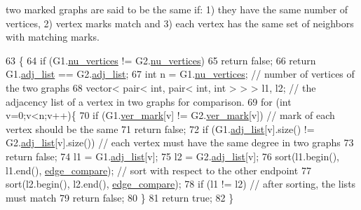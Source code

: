 two marked graphs are said to be the same if\+: 1) they have the same number of vertices, 2) vertex marks match and 3) each vertex has the same set of neighbors with matching marks. 
\begin{DoxyCode}
63 \{
64   \textcolor{keywordflow}{if} (G1.\hyperlink{classmarked__graph_acf79c6aeb8f32614cb14a5baaa6c9f9b}{nu\_vertices} != G2.\hyperlink{classmarked__graph_acf79c6aeb8f32614cb14a5baaa6c9f9b}{nu\_vertices})
65     \textcolor{keywordflow}{return} \textcolor{keyword}{false};
66   \textcolor{keywordflow}{return} G1.\hyperlink{classmarked__graph_a1a0bf7ca413a278763f7c878b3b6fd6f}{adj\_list} == G2.\hyperlink{classmarked__graph_a1a0bf7ca413a278763f7c878b3b6fd6f}{adj\_list};
67   \textcolor{keywordtype}{int} n = G1.\hyperlink{classmarked__graph_acf79c6aeb8f32614cb14a5baaa6c9f9b}{nu\_vertices}; \textcolor{comment}{// number of vertices of the two graphs}
68   vector< pair< int, pair< int, int > > > l1, l2; \textcolor{comment}{// the adjacency list of a vertex in two graphs for
       comparison. }
69   \textcolor{keywordflow}{for} (\textcolor{keywordtype}{int} v=0;v<n;v++)\{
70     \textcolor{keywordflow}{if} (G1.\hyperlink{classmarked__graph_ac83e9377dd4d8bb95be1ac949b127296}{ver\_mark}[v] != G2.\hyperlink{classmarked__graph_ac83e9377dd4d8bb95be1ac949b127296}{ver\_mark}[v]) \textcolor{comment}{// mark of each vertex should be the same}
71       \textcolor{keywordflow}{return} \textcolor{keyword}{false};
72     \textcolor{keywordflow}{if} (G1.\hyperlink{classmarked__graph_a1a0bf7ca413a278763f7c878b3b6fd6f}{adj\_list}[v].size() != G2.\hyperlink{classmarked__graph_a1a0bf7ca413a278763f7c878b3b6fd6f}{adj\_list}[v].size()) \textcolor{comment}{// each vertex must have the same
       degree in two graphs}
73       \textcolor{keywordflow}{return} \textcolor{keyword}{false};
74     l1 = G1.\hyperlink{classmarked__graph_a1a0bf7ca413a278763f7c878b3b6fd6f}{adj\_list}[v];
75     l2 = G2.\hyperlink{classmarked__graph_a1a0bf7ca413a278763f7c878b3b6fd6f}{adj\_list}[v];
76     sort(l1.begin(), l1.end(), \hyperlink{marked__graph_8cpp_a09dd24caed50b1d106e10538e688b6ac}{edge\_compare}); \textcolor{comment}{// sort with respect to the other endpoint}
77     sort(l2.begin(), l2.end(), \hyperlink{marked__graph_8cpp_a09dd24caed50b1d106e10538e688b6ac}{edge\_compare});
78     \textcolor{keywordflow}{if} (l1 != l2) \textcolor{comment}{// after sorting, the lists must match}
79       \textcolor{keywordflow}{return} \textcolor{keyword}{false};
80   \}
81   \textcolor{keywordflow}{return} \textcolor{keyword}{true};
82 \}
\end{DoxyCode}


